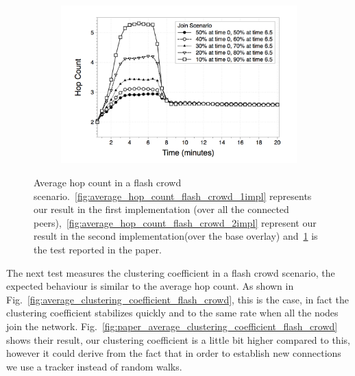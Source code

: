 \begin{figure}
\begin{subfigure}{.5\textwidth}
  \includegraphics[keepaspectratio=true, width=1\linewidth]{images/paper_average_hop_count_flash_crowd}
  \caption{}
  \label{fig:paper_average_hop_count_flash_crowd}
\end{subfigure}
\caption{Average hop count in a flash crowd scenario.~\ref{fig:average_hop_count_flash_crowd_1impl} represents our result in the first implementation (\getMetropolisHastingsNeighbour over all the connected peers),~\ref{fig:average_hop_count_flash_crowd_2impl} represent our result in the second implementation(\getMetropolisHastingsNeighbour over the base overlay) and~\ref{fig:paper_average_hop_count_flash_crowd} is the test reported in the paper.}
\label{fig:robustness_hop_count_flash_crowd}
\end{figure}

The next test measures the clustering coefficient in a flash crowd scenario, the expected behaviour is similar to the average hop count. As shown in Fig.~\ref{fig:average_clustering_coefficient_flash_crowd}, this is the case, in fact the clustering coefficient stabilizes quickly and to the same rate when all the nodes join the network. Fig.~\ref{fig:paper_average_clustering_coefficient_flash_crowd} shows their result, our clustering coefficient is a little bit higher compared to this, however it could derive from the fact that in order to establish new connections we use a tracker instead of random walks.

